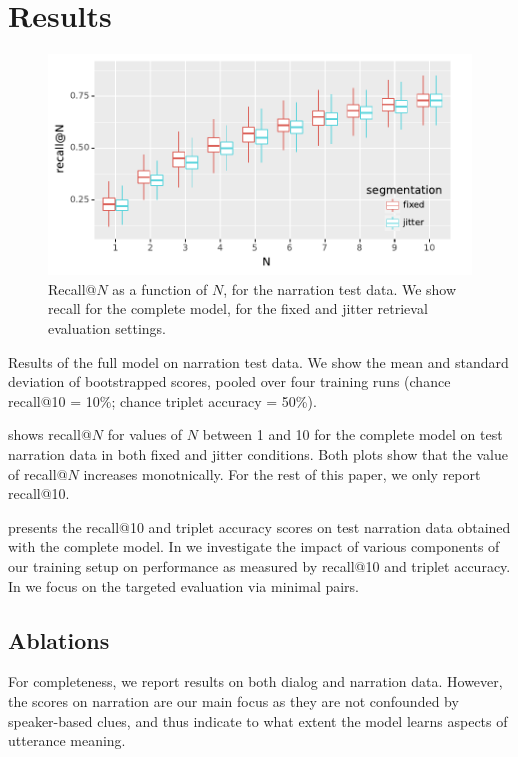 \section{Results}
\label{sec:results}

\begin{figure}[htb]
  \centering
  \includegraphics[width=\columnwidth]{results/recall_at_1_to_n_test.pdf}
  \caption{Recall@$N$ as a function of $N$, for the narration test
    data. We show recall for the complete model, for the {\sc fixed} and {\sc jitter}
    retrieval evaluation settings. }
  \label{fig:recall_at_1_to_n}
\end{figure}

\begin{table}[htb]
  
  \caption{Results of the full model on narration test
  	data. We show the mean and standard deviation of 
  	bootstrapped scores, pooled over four training runs
	(chance recall@10 = 10\%; chance triplet accuracy = 50\%).}
  \label{tab:test_scores}
\end{table}


 shows recall@$N$ for values of $N$
between 1 and 10 for the complete model on test narration data in both 
{\sc fixed} and {\sc jitter} conditions. Both plots show that the value of 
recall@$N$ increases monotnically. For the rest 
of this paper, we only report recall@10.

 presents the recall@10 and triplet accuracy
scores on test narration data obtained with the complete
model. In  we investigate the impact
of various components of our training setup on performance as measured
by recall@10 and triplet accuracy.  In  we
focus on the targeted evaluation via minimal pairs.


\subsection{Ablations}
\label{sec:ablations}
For completeness, we report results on both dialog and narration
data. However, the scores on narration are our main focus as they are
not confounded by speaker-based clues, and thus indicate to what
extent the model learns aspects of utterance meaning.

